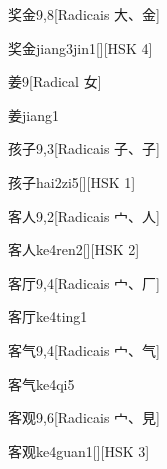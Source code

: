 \begin{entry}{奖金}{9,8}[Radicais ⼤、⾦]
  \begin{phonetics}{奖金}{jiang3jin1}[][HSK 4]
  \end{phonetics}
\end{entry}

\begin{entry}{姜}{9}[Radical ⼥]
  \begin{phonetics}{姜}{jiang1}
  \end{phonetics}
\end{entry}

\begin{entry}{孩子}{9,3}[Radicais ⼦、⼦]
  \begin{phonetics}{孩子}{hai2zi5}[][HSK 1]
  \end{phonetics}
\end{entry}

\begin{entry}{客人}{9,2}[Radicais ⼧、⼈]
  \begin{phonetics}{客人}{ke4ren2}[][HSK 2]
  \end{phonetics}
\end{entry}

\begin{entry}{客厅}{9,4}[Radicais ⼧、⼚]
  \begin{phonetics}{客厅}{ke4ting1}
  \end{phonetics}
\end{entry}

\begin{entry}{客气}{9,4}[Radicais ⼧、⽓]
  \begin{phonetics}{客气}{ke4qi5}
  \end{phonetics}
\end{entry}

\begin{entry}{客观}{9,6}[Radicais ⼧、⾒]
  \begin{phonetics}{客观}{ke4guan1}[][HSK 3]
  \end{phonetics}
\end{entry}

